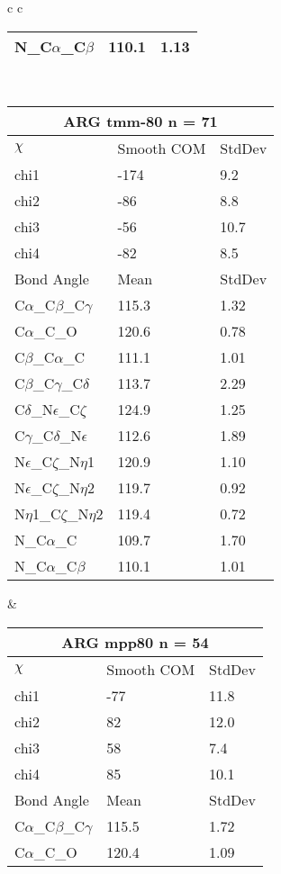 \begin{longtable}{ c c }
\begin{tabular}{ l l l }
  N\_C$\alpha$\_C$\beta$ & 110.1 & 1.13\\
  \bottomrule
  \end{tabular}
  \\
  \begin{tabular}{ l l l }
  \toprule
  \multicolumn{3}{c}{ARG \textbf{tmm-80} n = 71} \\ \toprule
  $\chi$       & Smooth COM & StdDev \\ \midrule
  chi1 & -174 & 9.2 \\ 
  chi2 & -86 & 8.8 \\ 
  chi3 & -56 & 10.7 \\ 
  chi4 & -82 & 8.5 \\ \midrule
  Bond Angle   & Mean     & StdDev \\ \midrule
  C$\alpha$\_C$\beta$\_C$\gamma$ & 115.3 & 1.32\\
  C$\alpha$\_C\_O & 120.6 & 0.78\\
  C$\beta$\_C$\alpha$\_C & 111.1 & 1.01\\
  C$\beta$\_C$\gamma$\_C$\delta$ & 113.7 & 2.29\\
  C$\delta$\_N$\epsilon$\_C$\zeta$ & 124.9 & 1.25\\
  C$\gamma$\_C$\delta$\_N$\epsilon$ & 112.6 & 1.89\\
  N$\epsilon$\_C$\zeta$\_N$\eta$1 & 120.9 & 1.10\\
  N$\epsilon$\_C$\zeta$\_N$\eta$2 & 119.7 & 0.92\\
  N$\eta$1\_C$\zeta$\_N$\eta$2 & 119.4 & 0.72\\
  N\_C$\alpha$\_C & 109.7 & 1.70\\
  N\_C$\alpha$\_C$\beta$ & 110.1 & 1.01\\
  \bottomrule
  \end{tabular}
  &
  \begin{tabular}{ l l l }
  \toprule
  \multicolumn{3}{c}{ARG \textbf{mpp80} n = 54} \\ \toprule
  $\chi$       & Smooth COM & StdDev \\ \midrule
  chi1 & -77 & 11.8 \\ 
  chi2 & 82 & 12.0 \\ 
  chi3 & 58 & 7.4 \\ 
  chi4 & 85 & 10.1 \\ \midrule
  Bond Angle   & Mean     & StdDev \\ \midrule
  C$\alpha$\_C$\beta$\_C$\gamma$ & 115.5 & 1.72\\
  C$\alpha$\_C\_O & 120.4 & 1.09\\

\end{tabular}
\end{longtable}
